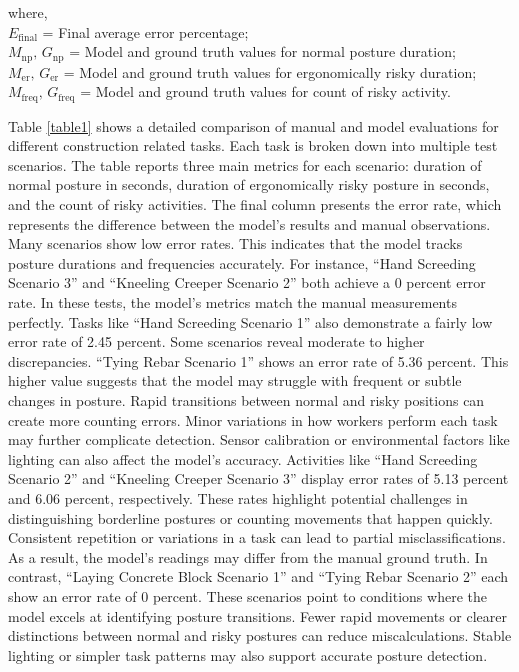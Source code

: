 \documentclass[11pt]{article}
\begin{document}
\noindent where,\\
$E_{\mathrm{final}}$  = Final average error percentage;\\
$M_{\mathrm{np}},\, G_{\mathrm{np}}$  = Model and ground truth values for normal posture duration;\\
$M_{\mathrm{er}},\, G_{\mathrm{er}}$ = Model and ground truth values for ergonomically risky duration;\\
$M_{\mathrm{freq}},\, G_{\mathrm{freq}} $ = Model and ground truth values for count of risky activity.



Table \ref{table1} shows a detailed comparison of manual and model evaluations for different construction related tasks. Each task is broken down into multiple test scenarios. The table reports three main metrics for each scenario: duration of normal posture in seconds, duration of ergonomically risky posture in seconds, and the count of risky activities. The final column presents the error rate, which represents the difference between the model's results and manual observations. Many scenarios show low error rates. This indicates that the model tracks posture durations and frequencies accurately. For instance, ``Hand Screeding Scenario 3'' and ``Kneeling Creeper Scenario 2'' both achieve a 0 percent error rate. In these tests, the model’s metrics match the manual measurements perfectly. Tasks like ``Hand Screeding Scenario 1'' also demonstrate a fairly low error rate of 2.45 percent. Some scenarios reveal moderate to higher discrepancies. ``Tying Rebar Scenario 1'' shows an error rate of 5.36 percent. This higher value suggests that the model may struggle with frequent or subtle changes in posture. Rapid transitions between normal and risky positions can create more counting errors. Minor variations in how workers perform each task may further complicate detection. Sensor calibration or environmental factors like lighting can also affect the model's accuracy. Activities like ``Hand Screeding Scenario 2'' and ``Kneeling Creeper Scenario 3'' display error rates of 5.13 percent and 6.06 percent, respectively. These rates highlight potential challenges in distinguishing borderline postures or counting movements that happen quickly. Consistent repetition or variations in a task can lead to partial misclassifications. As a result, the model's readings may differ from the manual ground truth. In contrast, ``Laying Concrete Block Scenario 1'' and ``Tying Rebar Scenario 2'' each show an error rate of 0 percent. These scenarios point to conditions where the model excels at identifying posture transitions. Fewer rapid movements or clearer distinctions between normal and risky postures can reduce miscalculations. Stable lighting or simpler task patterns may also support accurate posture detection. 
\end{document}
